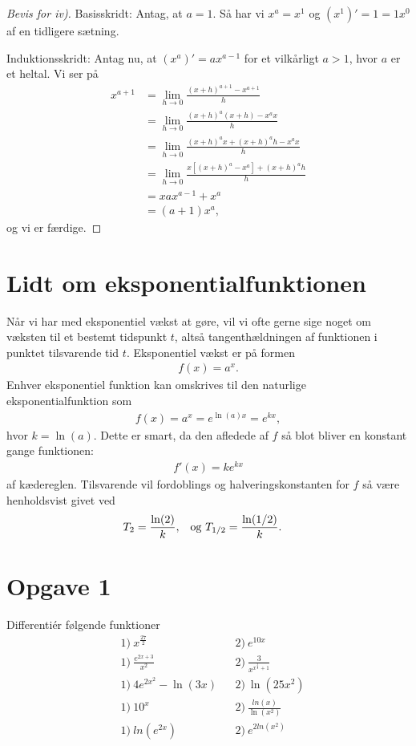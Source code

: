 \begin{proof}[Bevis for iv)]
Basisskridt: Antag, at $a=1$. Så har vi $x^a = x^1$ og $(x^1)' = 1 = 1x^0$ af en tidligere sætning. 

Induktionsskridt: Antag nu, at $(x^a)' = ax^{a-1}$ for et vilkårligt $a>1$, hvor $a$ er et heltal. Vi ser på
\begin{align*}
x^{a+1} &= \lim_{h\to 0} \frac{(x+h)^{a+1}-x^{a+1}}{h}\\
&= \lim_{h\to 0} \frac{(x+h)^a(x+h)-x^ax}{h}\\
&= \lim_{h\to 0} \frac{(x+h)^ax+(x+h)^ah-x^ax}{h}\\
&= \lim_{h\to 0} \frac{x[(x+h)^a-x^a] + (x+h)^ah}{h}\\
&=x ax^{a-1}+x^a\\
&= (a+1)x^a,
\end{align*}
og vi er færdige.
\end{proof}
\section*{Lidt om eksponentialfunktionen}
Når vi har med eksponentiel vækst at gøre, vil vi ofte gerne sige noget om væksten til et bestemt tidspunkt $t$, altså tangenthældningen af funktionen i punktet tilsvarende tid $t$. Eksponentiel vækst er på formen
\begin{align*}
f(x) = a^x.
\end{align*}
Enhver eksponentiel funktion kan omskrives til den naturlige eksponentialfunktion som
\begin{align*}
f(x) = a^x = e^{\ln(a)x} = e^{kx},
\end{align*}
hvor $k=\ln(a)$. Dette er smart, da den afledede af $f$ så blot bliver en konstant gange funktionen:
\begin{align*}
f'(x) = ke^{kx}
\end{align*}
af kædereglen. Tilsvarende vil fordoblings og halveringskonstanten for $f$ så være henholdsvist givet ved
\begin{align*}
&T_2 = \frac{\ln(2)}{k}, &&\textnormal{og }T_{1/2} = \frac{\ln(1/2)}{k}.
\end{align*}

\section*{Opgave 1}
Differentiér følgende funktioner
\begin{align*}
&1) \ x^\frac{27}{2}   &&2) \  e^{10x}   \\
&1) \ \frac{e^{2x+3}}{x^2}   &&2) \ \frac{3}{x^{x^{\frac{3}{2}}+1}}    \\
&1) \  4e^{2x^2}-\ln(3x)  &&2) \ \ln(25x^2)      \\
&1) \ 10^x   &&2) \  \frac{ln(x)}{\ln(x^2)}   \\
&1) \  ln(e^{2x})  &&2) \  e^{2ln(x^2)}   \\
\end{align*}
